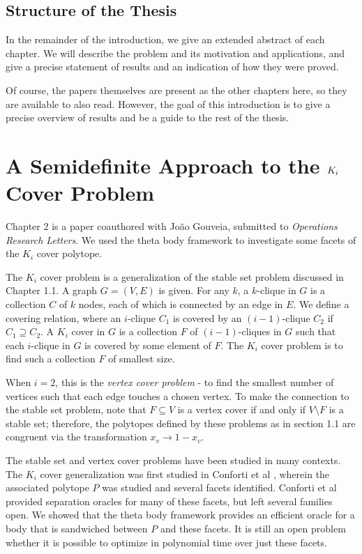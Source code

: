 \subsection{Structure of the Thesis}
In the remainder of the introduction, we give an extended abstract of each
chapter. We will describe the problem and its motivation and applications,
and give a precise statement of results and an indication of how they were 
proved.

Of course, the papers themselves are present as the other chapters here, so
they are available to also read. However, the goal of this introduction
is to give a precise overview of results and be a guide to the rest of the
thesis.

\section{A Semidefinite Approach to the $K_\MakeLowercase{i}$ Cover Problem}
Chapter 2 is a paper coauthored with Jo\~ao Gouveia, submitted to 
\emph{Operations Research Letters}. We used the theta body framework to
investigate some facets of the $K_i$ cover polytope.

The $K_i$ cover problem is a generalization of the stable set problem discussed
in Chapter 1.1. A graph $G = (V,E)$ is given. For any $k$, a $k$-clique in $G$
is a collection $C$ of $k$ nodes, each of which is connected by an edge in $E$.
We define a covering relation, where an $i$-clique $C_1$ is covered by an 
$(i-1)$-clique $C_2$ if $C_1 \supseteq C_2$. A $K_i$ cover in $G$ is a
collection $F$ of $(i-1)$-cliques in $G$ such that each $i$-clique in $G$
is covered by some element of $F$. The $K_i$ cover problem is to find such a
collection $F$ of smallest size.

When $i=2$, this is the \emph{vertex cover problem} - to find the smallest
number of vertices such that each edge touches a chosen vertex. To make the
connection to the stable set problem, note that $F \subseteq V$ is a vertex
cover if and only if $V \setminus F$ is a stable set; therefore, the polytopes
defined by these problems as in section 1.1 are congruent via the transformation
$x_v \to 1-x_v$.

The stable set and vertex cover problems have been studied in many contexts. 
The $K_i$ cover generalization was first studied in Conforti et al \cite{conforti}, wherein the associated polytope $P$ was studied and several facets
identified. Conforti et al provided separation oracles for many of these
facets, but left several families open. We showed that the theta body framework
provides an efficient oracle for a body that is sandwiched between $P$ and 
these facets. It is still an open problem whether it is possible to optimize in
polynomial time over just these facets.

